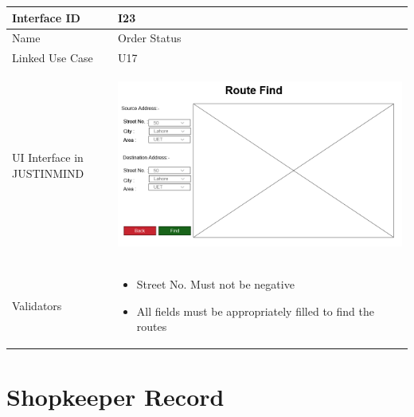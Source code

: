 \documentclass[12pt,a4paper]{report}
\begin{document}
\begin{tabular}{ | m{3cm} | m{12cm}| } \hline

Interface ID &  I23 \\\hline

Name  & Order Status  \\ \hline

Linked Use Case & U17 \\ \hline

UI Interface in JUSTINMIND & \begin{center} \includegraphics[scale=0.3]{./UIs for Latex Reports/UI-024 Route Finder@1x.png}\end{center}  \\ \hline

Validators & 
\begin{itemize}
\item  Street No. Must not be negative
\item All fields must be appropriately filled to find the routes
 

\end{itemize}
\\ \hline

\end{tabular} 
\section{Shopkeeper Record }
\end{document}
